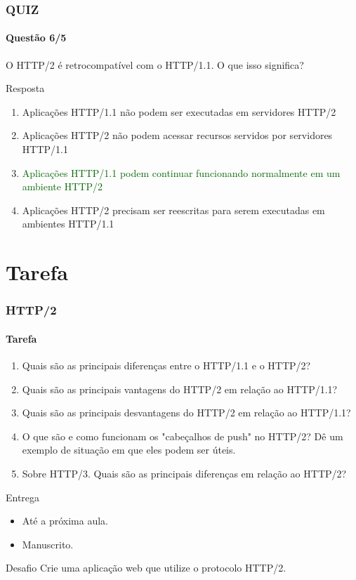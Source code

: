 \documentclass[
	9pt, %
	t, %
]{beamer}
\begin{document}
\begin{frame}
	\frametitle{QUIZ}
	\framesubtitle{Questão 6/5}

	{\Large O HTTP/2 é retrocompatível com o HTTP/1.1. O que isso significa? }

	\begin{exampleblock}{Resposta}
		\begin{enumerate}[a]
			\item Aplicações HTTP/1.1 não podem ser executadas em servidores HTTP/2
			\item Aplicações HTTP/2 não podem acessar recursos servidos por servidores HTTP/1.1
			\item \textcolor{darkgreen}{Aplicações HTTP/1.1 podem continuar funcionando normalmente em um ambiente HTTP/2}
			\item Aplicações HTTP/2 precisam ser reescritas para serem executadas em ambientes HTTP/1.1
		\end{enumerate}
	\end{exampleblock}

\end{frame}

\section{Tarefa}

\begin{frame}
	\frametitle{HTTP/2}
	\framesubtitle{Tarefa}

	\begin{enumerate}
		\item Quais são as principais diferenças entre o HTTP/1.1 e o HTTP/2?
		\item Quais são as principais vantagens do HTTP/2 em relação ao HTTP/1.1?
		\item Quais são as principais desvantagens do HTTP/2 em relação ao HTTP/1.1?
		\item O que são e como funcionam os "cabeçalhos de push" no HTTP/2? Dê um exemplo de situação em que eles podem ser úteis.
		\item Sobre HTTP/3. Quais são as principais diferenças em relação ao HTTP/2?
	\end{enumerate}

	\begin{exampleblock}{Entrega}
		\begin{itemize}
			\item Até a próxima aula.
			\item Manuscrito.
		\end{itemize}
	\end{exampleblock}

	\begin{block}{Desafio}
		Crie uma aplicação web que utilize o protocolo HTTP/2.
	\end{block}

\end{frame}
\end{document}
